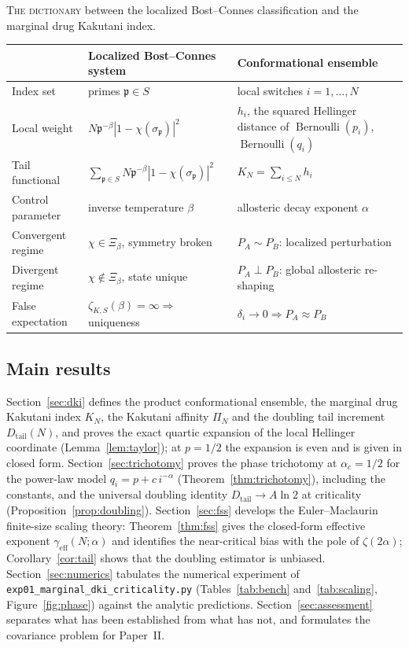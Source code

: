 \documentclass[11pt,reqno]{amsart}
\theoremstyle{plain}
\theoremstyle{definition}
\theoremstyle{remark}
\numberwithin{equation}{section}
\DeclareMathOperator{\Bern}{Bernoulli}
\newcommand{\Dtail}{D_{\mathrm{tail}}}
\newcommand{\geff}{\gamma_{\mathrm{eff}}}
\newcommand{\PA}{P_{A}}
\newcommand{\PB}{P_{B}}
\begin{document}
\begin{center}\footnotesize
\textsc{The dictionary} between the localized Bost--Connes classification \cite{Chen2026} and the marginal drug Kakutani index.\\[4pt]
\begin{tabular}{@{}>{\raggedright\arraybackslash}p{}>{\raggedright\arraybackslash}p{}>{\raggedright\arraybackslash}p{}@{}}
\toprule
& Localized Bost--Connes system & Conformational ensemble \\
\midrule
Index set & primes $\mathfrak p\in S$ & local switches $i=1,\dots,N$ \\
Local weight & $N\mathfrak p^{-\beta}|1-\chi(\sigma_{\mathfrak p})|^2$ & $h_i$, the squared Hellinger distance of $\Bern(p_i)$, $\Bern(q_i)$ \\
Tail functional & $\sum_{\mathfrak p\in S}N\mathfrak p^{-\beta}|1-\chi(\sigma_{\mathfrak p})|^2$ & $K_N=\sum_{i\le N}h_i$ \\
Control parameter & inverse temperature $\beta$ & allosteric decay exponent $\alpha$ \\
Convergent regime & $\chi\in\Xi_\beta$, symmetry broken & $\PA\sim\PB$: localized perturbation \\
Divergent regime & $\chi\notin\Xi_\beta$, state unique & $\PA\perp\PB$: global allosteric re-shaping \\
False expectation & $\zeta_{K,S}(\beta)=\infty\Rightarrow$ uniqueness & $\delta_i\to0\Rightarrow\PA\approx\PB$ \\
\bottomrule
\end{tabular}
\end{center}

\subsection*{Main results}
Section~\ref{sec:dki} defines the product conformational ensemble, the marginal drug Kakutani index $K_N$, the Kakutani affinity $\Pi_N$ and the doubling tail increment $\Dtail(N)$, and proves the exact quartic expansion of the local Hellinger coordinate (Lemma~\ref{lem:taylor}); at $p=1/2$ the expansion is even and is given in closed form. Section~\ref{sec:trichotomy} proves the phase trichotomy at $\alpha_c=1/2$ for the power-law model $q_i=p+c\,i^{-\alpha}$ (Theorem~\ref{thm:trichotomy}), including the constants, and the universal doubling identity $\Dtail\to A\ln 2$ at criticality (Proposition~\ref{prop:doubling}). Section~\ref{sec:fss} develops the Euler--Maclaurin finite-size scaling theory: Theorem~\ref{thm:fss} gives the closed-form effective exponent $\geff(N;\alpha)$ and identifies the near-critical bias with the pole of $\zeta(2\alpha)$; Corollary~\ref{cor:tail} shows that the doubling estimator is unbiased. Section~\ref{sec:numerics} tabulates the numerical experiment of \texttt{exp01\_marginal\_dki\_criticality.py} (Tables~\ref{tab:bench} and~\ref{tab:scaling}, Figure~\ref{fig:phase}) against the analytic predictions. Section~\ref{sec:assessment} separates what has been established from what has not, and formulates the covariance problem for Paper~II.
\end{document}
